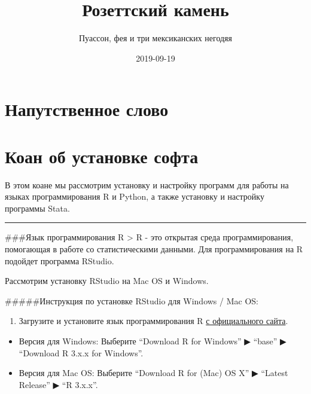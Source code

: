 \documentclass[]{book}
\title{Розеттский камень}
\author{Пуассон, фея и три мексиканских негодяя}
\date{2019-09-19}
\providecommand{\tightlist}{%
  \setlength{\itemsep}{0pt}\setlength{\parskip}{0pt}}
\begin{document}
\maketitle

{
\setcounter{tocdepth}{1}
\tableofcontents
}
\hypertarget{-}{%
\chapter{Напутственное слово}\label{-}}

\hypertarget{installsoft}{%
\chapter{Коан об установке софта}\label{installsoft}}

В этом коане мы рассмотрим установку и настройку программ для работы на языках программирования R и Python, а также установку и настройку программы Stata.

\begin{center}\rule{0.5\linewidth}{\linethickness}\end{center}

\#\#\#Язык программирования R
\textgreater{} R - это открытая среда программирования, помогающая в работе со статистическими данными. Для программирования на R подойдет программа RStudio.

Рассмотрим установку RStudio на Mac OS и Windows.

\#\#\#\#\#Инструкция по установке RStudio для Windows / Mac OS:

\begin{enumerate}
\def\labelenumi{\arabic{enumi}.}
\tightlist
\item
  Загрузите и установите язык программирования R \href{http://cran.cnr.berkeley.edu/}{с официального сайта}.
\end{enumerate}

\begin{itemize}
\item
  Версия для Windows: Выберите ``Download R for Windows'' ▶ ``base'' ▶ ``Download R 3.x.x for Windows''.
\item
  Версия для Mac OS: Выберите ``Download R for (Mac) OS X'' ▶ ``Latest Release'' ▶ ``R 3.x.x''.
\end{itemize}
\end{document}
